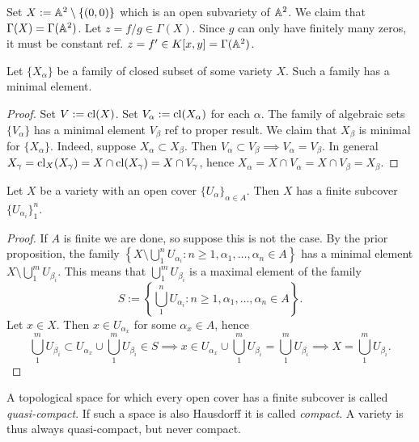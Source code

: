     \begin{example}\label{RationalFunctionsOnAffinePlaneWithoutAPointIsTheSameAsRationalFunctionsOnAffinePlane}
        Set $X:=\mathbb{A}^2\setminus \{(0,0)\}$ which is an open subvariety of $\mathbb{A}^2$. We claim that $\Gamma(X)=\Gamma(\mathbb{A}^2)$. Let $z=f/g\in \Gamma(X)$. Since $g$ can only have finitely many zeros, it must be constant {\Large ref}. $z=f'\in K[x,y]=\Gamma(\mathbb{A}^2)$.
    \end{example}
    \begin{proposition}
        Let $\{X_\alpha\}$ be a family of closed subset of some variety $X$. Such a family has a minimal element.
    \end{proposition}
    \begin{proof}
        Set $V:=\mathrm{cl}(X)$. Set $V_\alpha:= \mathrm{cl}(X_\alpha)$ for each $\alpha$. The family of algebraic sets $\{V_\alpha\}$ has a minimal element $V_\beta$ {\Large ref to proper result}. We claim that $X_\beta$ is minimal for $\{X_\alpha\}$. Indeed, suppose $X_\alpha \subset X_\beta$. Then $V_\alpha\subset V_\beta \implies V_\alpha =V_\beta$. In general $X_\gamma = \mathrm{cl}_X(X_\gamma)=X\cap \mathrm{cl}(X_\gamma)= X\cap V_\gamma$, hence $X_\alpha = X\cap V_\alpha = X\cap V_\beta = X_\beta$. 
    \end{proof}
    \begin{proposition}
        Let $X$ be a variety with an open cover $\{U_\alpha\}_{\alpha \in A}$. Then $X$ has a finite subcover $\{U_{\alpha_i}\}_1^n$.
    \end{proposition}
    \begin{proof}
        If $A$ is finite we are done, so suppose this is not the case. By the prior proposition, the family $\left\{ X\setminus \bigcup_1^n U_{\alpha_i} : n\geq 1, \alpha_1,\dots,\alpha_n\in A\right\}$ has a minimal element $X\setminus \bigcup_1^m U_{\beta_i}$. This means that $\bigcup_1^m U_{\beta_i}$ is a maximal element of the family 
        $$S:= \left\{ \bigcup_1^n U_{\alpha_i} : n\geq 1, \alpha_1,\dots,\alpha_n\in A\right\}.$$
        Let $x\in X$. Then $x\in U_{\alpha_x}$ for some $\alpha_x\in A$, hence 
        $$\bigcup_1^m U_{\beta_i} \subset U_{\alpha_x}\cup \bigcup_1^m U_{\beta_i}\in S \implies x\in U_{\alpha_x}\cup \bigcup_1^m U_{\beta_i} = \bigcup_1^m U_{\beta_i} \implies X= \bigcup_1^m U_{\beta_i}.$$
    \end{proof}
    \begin{remark}
        A topological space for which every open cover has a finite subcover is called \emph{quasi-compact}. If such a space is also Hausdorff it is called \emph{compact}. A variety is thus always quasi-compact, but never compact.  
    \end{remark}
